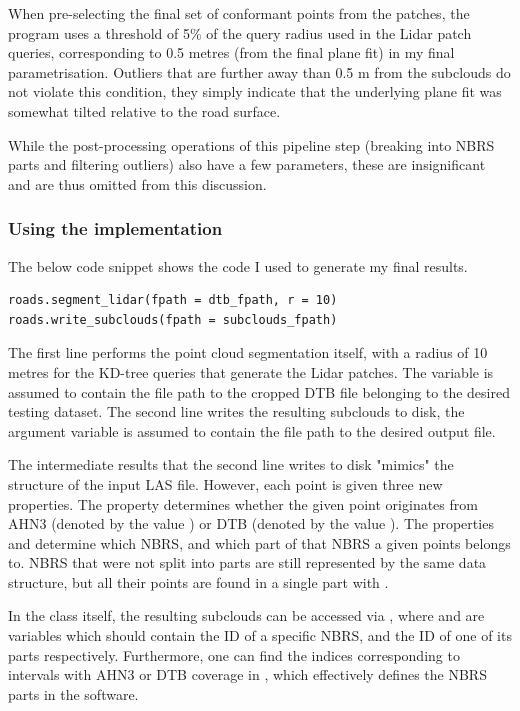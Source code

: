 When pre-selecting the final set of conformant points from the patches, the program uses a threshold of 5\% of the query radius used in the Lidar patch queries, corresponding to 0.5 metres (from the final plane fit) in my final parametrisation. Outliers that are further away than 0.5 m from the subclouds do not violate this condition, they simply indicate that the underlying plane fit was somewhat tilted relative to the road surface.

While the post-processing operations of this pipeline step (breaking into NBRS parts and filtering outliers) also have a few parameters, these are insignificant and are thus omitted from this discussion.

\subsubsection{Using the implementation}

The below code snippet shows the code I used to generate my final results.

\begin{lstlisting}
roads.segment_lidar(fpath = dtb_fpath, r = 10)
roads.write_subclouds(fpath = subclouds_fpath)
\end{lstlisting}

The first line performs the point cloud segmentation itself, with a radius of 10 metres for the KD-tree queries that generate the Lidar patches. The variable  is assumed to contain the file path to the cropped DTB file belonging to the desired testing dataset. The second line writes the resulting subclouds to disk, the argument variable is assumed to contain the file path to the desired output file.

The intermediate results that the second line writes to disk "mimics" the structure of the input LAS file. However, each point is given three new properties. The property  determines whether the given point originates from AHN3 (denoted by the value ) or DTB (denoted by the value ). The properties  and  determine which NBRS, and which part of that NBRS a given points belongs to. NBRS that were not split into parts are still represented by the same data structure, but all their points are found in a single part with .

In the class itself, the resulting subclouds can be accessed via , where  and  are variables which should contain the ID of a specific NBRS, and the ID of one of its parts respectively. Furthermore, one can find the indices corresponding to intervals with AHN3 or DTB coverage in , which effectively defines the NBRS parts in the software.


